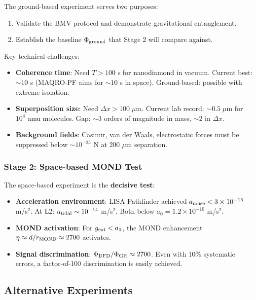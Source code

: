 \documentclass[11pt,a4paper]{article}
\begin{document}
The ground-based experiment serves two purposes:
\begin{enumerate}
\item Validate the BMV protocol and demonstrate gravitational entanglement.
\item Establish the baseline $\Phi_{\rm ground}$ that Stage 2 will compare against.
\end{enumerate}

Key technical challenges:
\begin{itemize}
\item \textbf{Coherence time}: Need $T > 100$ s for nanodiamond in vacuum. Current best: $\sim 10$ s (MAQRO-PF aims for $\sim 10$ s in space). Ground-based: possible with extreme isolation.
\item \textbf{Superposition size}: Need $\Delta x > 100\;\mu$m. Current lab record: $\sim 0.5\;\mu$m for $10^4$ amu molecules. Gap: $\sim 3$ orders of magnitude in mass, $\sim 2$ in $\Delta x$.
\item \textbf{Background fields}: Casimir, van der Waals, electrostatic forces must be suppressed below $\sim 10^{-25}$ N at 200 $\mu$m separation.
\end{itemize}

\subsubsection{Stage 2: Space-based MOND Test}

The space-based experiment is the \textbf{decisive test}:
\begin{itemize}
\item \textbf{Acceleration environment}: LISA Pathfinder achieved $a_{\rm noise} < 3\times 10^{-15}$ m/s$^2$. At L2: $a_{\rm tidal} \sim 10^{-14}$ m/s$^2$. Both below $a_0 = 1.2\times 10^{-10}$ m/s$^2$.
\item \textbf{MOND activation}: For $g_{\rm ext} < a_0$, the MOND enhancement $\eta \approx d/r_{\rm MOND} \approx 2700$ activates.
\item \textbf{Signal discrimination}: $\Phi_{\rm DFD}/\Phi_{\rm GR} \approx 2700$. Even with 10\% systematic errors, a factor-of-100 discrimination is easily achieved.
\end{itemize}

\subsection{Alternative Experiments}
\end{document}
